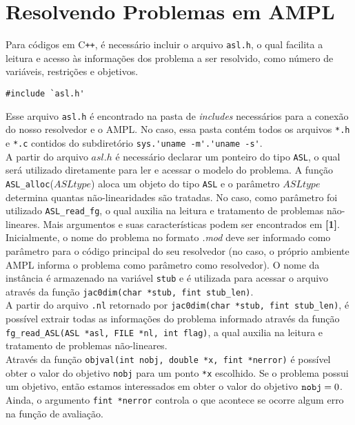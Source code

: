 \documentclass[a4paper, 12pt]{article}
\begin{document}
\section{Resolvendo Problemas em AMPL}
Para códigos em C\verb|++|, é necessário incluir o arquivo \verb|asl.h|, o qual facilita a leitura e acesso às informações dos problema a ser resolvido, como número de variáveis, restrições e objetivos.
\begin{verbatim}
#include `asl.h'
\end{verbatim}

Esse arquivo \verb|asl.h| é encontrado na pasta de \textit{includes} necessários para a conexão do nosso resolvedor e o AMPL. No caso, essa pasta contém todos os arquivos \verb|*.h| e \verb|*.c| contidos do subdiretório \verb|sys.'uname -m'.'uname -s'|. \\

A partir do arquivo $asl.h$ é necessário declarar um ponteiro do tipo \verb|ASL|, o qual será utilizado diretamente para ler e acessar o modelo do problema. 
A função \verb|ASL_alloc|($ASLtype$) aloca um objeto do tipo \verb|ASL| e o parâmetro $ASLtype$ determina quantas não-linearidades são tratadas. No caso, como parâmetro foi utilizado \verb|ASL_read_fg|, o qual auxilia na leitura e tratamento de problemas não-lineares. Mais argumentos e suas características podem ser encontrados em \textbf{[1]}. \\

Inicialmente, o nome do problema no formato \textit{.mod} deve ser informado como parâmetro para o código principal do seu resolvedor (no caso, o próprio ambiente AMPL informa o problema como parâmetro como resolvedor). O nome da instância é armazenado na variável \verb|stub| e é utilizada para acessar o arquivo através da função \verb|jac0dim(char *stub, fint stub_len)|. \\ 

A partir do arquivo \verb|.nl| retornado por \verb|jac0dim(char *stub, fint stub_len)|, é possível extrair todas as informações do problema informado através da função \verb|fg_read_ASL(ASL *asl, FILE *nl, int flag)|, a qual auxilia na leitura e tratamento de problemas não-lineares.\\  

Através da função \verb|objval(int nobj, double *x, fint *nerror)| é possível obter o valor do objetivo \verb|nobj| para um ponto \verb|*x| escolhido. Se o problema possui um objetivo, então estamos interessados em obter o valor do objetivo $\verb|nobj| = 0$. Ainda, o argumento \verb|fint *nerror| controla o que acontece se ocorre algum erro na função de avaliação. \\
\end{document}
